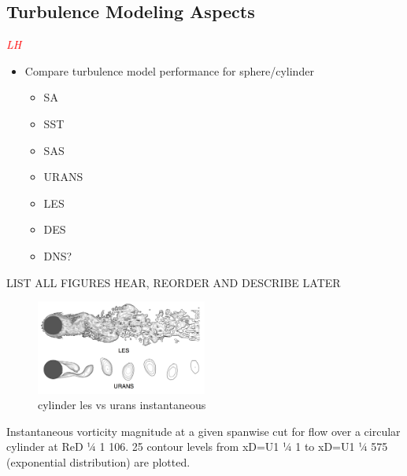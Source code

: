 \documentclass[journal]{new-aiaa}
\begin{document}
\subsection{Turbulence Modeling Aspects} \label{subsec:turbulencemodeling}

\textcolor{red}{\emph{LH}}

\begin{itemize}
    \item Compare turbulence model performance for sphere/cylinder
    \begin{itemize}
        \item SA
        \item SST
        \item SAS
        \item URANS
        \item LES
        \item DES
        \item DNS?
    \end{itemize}
\end{itemize}


LIST ALL FIGURES HEAR, REORDER AND DESCRIBE LATER



\begin{figure}[H]
\begin{center}
\includegraphics[width=0.5\textwidth]{Images/logan/catalano_2003numerical_UnsteadyURANSvsLES.pdf}
\caption{ cylinder les vs urans instantaneous \cite{catalano2003numerical} }
\label{fig:lesvsuranscylinderinstant}
\end{center}
\end{figure}

Instantaneous vorticity magnitude at a given spanwise cut for flow over a circular cylinder at ReD 1⁄4 1   106. 25 contour levels from xD=U1 1⁄4 1 to xD=U1 1⁄4 575 (exponential distribution) are plotted.
\end{document}
